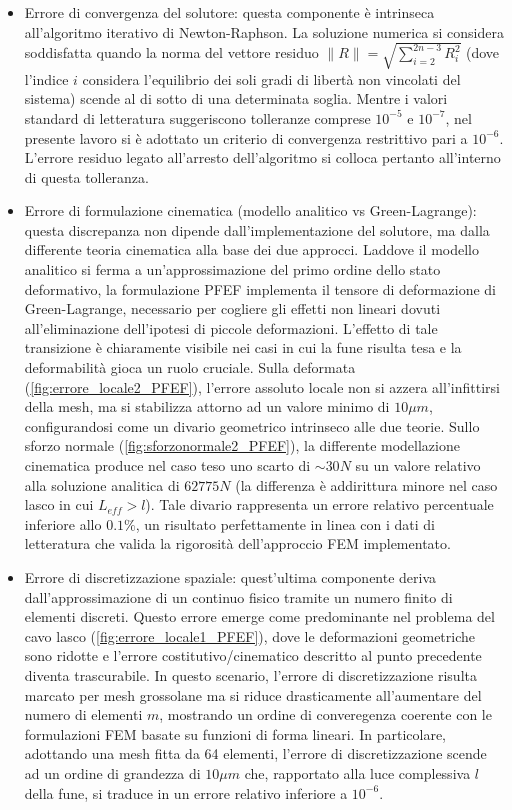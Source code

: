 \begin{itemize}
   \item Errore di convergenza del solutore: questa componente è intrinseca all'algoritmo iterativo di Newton-Raphson. La soluzione numerica si considera soddisfatta quando la norma del vettore residuo $\|R\| = \sqrt{\sum_{i=2}^{2n-3} R_i^2}$ (dove l'indice $i$ considera l'equilibrio dei soli gradi di libertà non vincolati del sistema) scende al di sotto di una determinata soglia. Mentre i valori standard di letteratura suggeriscono tolleranze comprese $10^{-5}$ e $10^{-7}$, nel presente lavoro si è adottato un criterio di convergenza restrittivo pari a $10^{-6}$. L'errore residuo legato all'arresto dell'algoritmo si colloca pertanto all'interno di questa tolleranza. 
   \item Errore di formulazione cinematica (modello analitico vs Green-Lagrange): questa discrepanza non dipende dall'implementazione del solutore, ma dalla differente teoria cinematica alla base dei due approcci. Laddove il modello analitico si ferma a un'approssimazione del primo ordine dello stato deformativo, la formulazione PFEF implementa il tensore di deformazione di Green-Lagrange, necessario per cogliere gli effetti non lineari dovuti all'eliminazione dell'ipotesi di piccole deformazioni. L'effetto di tale transizione è chiaramente visibile nei casi in cui la fune risulta tesa e la deformabilità gioca un ruolo cruciale. Sulla deformata (\cref{fig:errore_locale2_PFEF}), l'errore assoluto locale non si azzera all'infittirsi della mesh, ma si stabilizza attorno ad un valore minimo di $10 \mu m $, configurandosi come un divario geometrico intrinseco alle due teorie. Sullo sforzo normale (\cref{fig:sforzonormale2_PFEF}), la differente modellazione cinematica produce nel caso teso uno scarto di $\sim 30N$ su un valore relativo alla soluzione analitica di $62775N$ (la differenza è addirittura minore nel caso lasco in cui $L_{eff}>l$). Tale divario rappresenta un errore relativo percentuale inferiore allo $0.1\%$, un risultato perfettamente in linea con i dati di letteratura che valida la rigorosità dell'approccio FEM implementato. 
   \item Errore di discretizzazione spaziale: quest'ultima componente deriva dall'approssimazione di un continuo fisico tramite un numero finito di elementi discreti. Questo errore emerge come predominante nel problema del cavo lasco (\cref{fig:errore_locale1_PFEF}), dove le deformazioni geometriche sono ridotte e l'errore costitutivo/cinematico descritto al punto precedente diventa trascurabile. In questo scenario, l'errore di discretizzazione risulta marcato per mesh grossolane ma si riduce drasticamente all'aumentare del numero di elementi $m$, mostrando un ordine di converegenza coerente con le formulazioni FEM basate su funzioni di forma lineari. In particolare, adottando una mesh fitta da 64 elementi, l'errore di discretizzazione scende ad un ordine di grandezza di $10\mu m$ che, rapportato alla luce complessiva $l$ della fune, si traduce in un errore relativo inferiore a $10^{-6}$.
\end{itemize}

